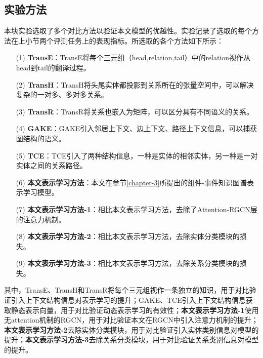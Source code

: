 \subsection{实验方法}
本块实验选取了多个对比方法以验证本文模型的优越性。实验记录了选取的每个方法在上小节两个评测任务上的表现指标。所选取的各个方法如下所示：
\begin{itemize}
    \item [(1)] 
    \textbf{TransE}\cite{bordes2013translatingE}：TransE将每个三元组（head,relation,tail）中的relation视作从head到tail的翻译过程。
    \item [(2)]
    \textbf{TransH}\cite{wang2014knowledge}：TransH将头尾实体都投影到关系所在的张量空间中，可以解决复杂的一对多、多对多关系。
    \item [(3)]
    \textbf{TransR}\cite{lin2015learning}：TransR将关系也嵌入为矩阵，可以区分具有不同语义的关系。
    \item [(4)]
    \textbf{GAKE}\cite{feng2016gake}：GAKE引入邻居上下文、边上下文、路径上下文信息，可以捕获图结构的语义。
    \item [(5)]
    \textbf{TCE}\cite{shi2017knowledge}：TCE引入了两种结构信息，一种是实体的相邻实体，另一种是一对实体之间的关系路径。
    \item [(6)]
    \textbf{本文表示学习方法}：本文在章节\ref{chapter-3}所提出的组件-事件知识图谱表示学习模型。
    \item [(7)]
    \textbf{本文表示学习方法-1}：相比本文表示学习方法，去除了Attention-RGCN层的注意力机制。
    \item [(8)]
    \textbf{本文表示学习方法-2}：相比本文表示学习方法，去除实体分类模块的损失。
    \item [(9)]
    \textbf{本文表示学习方法-3}：相比本文表示学习方法，去除关系分类模块的损失。
  \end{itemize}

其中，TransE、TransH和TransR将每个三元组视作一条独立的知识，用于对比验证引入上下文结构信息对表示学习的提升；GAKE、TCE引入上下文结构信息获取静态表示向量，用于对比验证动态表示学习的有效性；\textbf{本文表示学习方法-1}使用无attention机制的RGCN，用于对比验证本文在RGCN中引入注意力机制的提升；\textbf{本文表示学习方法-2}去除实体分类模块，用于对比验证引入实体类别信息对模型的提升；\textbf{本文表示学习方法-3}去除关系分类模块，用于对比验证关系类别信息对模型的提升。

